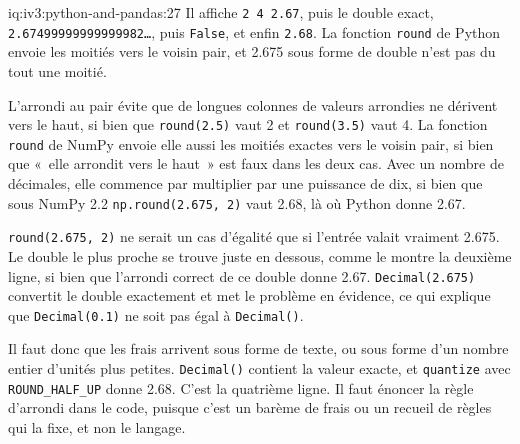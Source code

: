 \begin{solution}{iq:iv3:python-and-pandas:27}
Il affiche \texttt{2 4 2.67}, puis le double exact, \texttt{2.67499999999999982\dots}, puis \texttt{False}, et enfin \texttt{2.68}. La fonction \texttt{round} de Python envoie les moitiés vers le voisin pair, et 2.675 sous forme de double n'est pas du tout une moitié.

L'arrondi au pair évite que de longues colonnes de valeurs arrondies ne dérivent vers le haut, si bien que \texttt{round(2.5)} vaut 2 et \texttt{round(3.5)} vaut 4. La fonction \texttt{round} de NumPy envoie elle aussi les moitiés exactes vers le voisin pair, si bien que «~elle arrondit vers le haut~» est faux dans les deux cas. Avec un nombre de décimales, elle commence par multiplier par une puissance de dix, si bien que sous NumPy 2.2 \texttt{np.round(2.675, 2)} vaut 2.68, là où Python donne 2.67.

\texttt{round(2.675, 2)} ne serait un cas d'égalité que si l'entrée valait vraiment 2.675. Le double le plus proche se trouve juste en dessous, comme le montre la deuxième ligne, si bien que l'arrondi correct de ce double donne 2.67. \texttt{Decimal(2.675)} convertit le double exactement et met le problème en évidence, ce qui explique que \texttt{Decimal(0.1)} ne soit pas égal à \texttt{Decimal(\textquotesingle)}.

Il faut donc que les frais arrivent sous forme de texte, ou sous forme d'un nombre entier d'unités plus petites. \texttt{Decimal(\textquotesingle)} contient la valeur exacte, et \texttt{quantize} avec \texttt{ROUND\_HALF\_UP} donne 2.68. C'est la quatrième ligne. Il faut énoncer la règle d'arrondi dans le code, puisque c'est un barème de frais ou un recueil de règles qui la fixe, et non le langage.

\end{solution}

